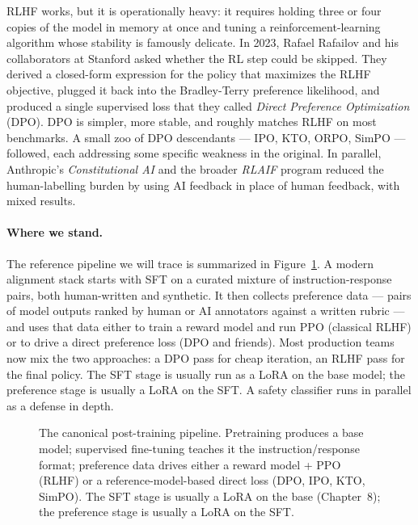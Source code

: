 RLHF works, but it is operationally heavy: it requires holding
three or four copies of the model in memory at once and tuning a
reinforcement-learning algorithm whose stability is famously
delicate. In 2023, Rafael Rafailov and his collaborators at Stanford
asked whether the RL step could be skipped. They derived a
closed-form expression for the policy that maximizes the RLHF
objective, plugged it back into the Bradley-Terry preference
likelihood, and produced a single supervised loss that they called
\emph{Direct Preference Optimization} (DPO). DPO is simpler, more
stable, and roughly matches RLHF on most benchmarks. A small zoo of
DPO descendants --- IPO, KTO, ORPO, SimPO --- followed, each
addressing some specific weakness in the original. In parallel,
Anthropic's \emph{Constitutional AI} and the broader \emph{RLAIF}
program reduced the human-labelling burden by using AI feedback in
place of human feedback, with mixed results.

\paragraph{Where we stand.}
The reference pipeline we will trace is summarized in
Figure~\ref{fig:rlhf-pipeline}. A modern alignment stack starts with
SFT on a curated mixture of instruction-response pairs, both
human-written and synthetic. It then collects preference data ---
pairs of model outputs ranked by human or AI annotators against a
written rubric --- and uses that data either to train a reward
model and run PPO (classical RLHF) or to drive a direct preference
loss (DPO and friends). Most production teams now mix the two
approaches: a DPO pass for cheap iteration, an RLHF pass for the
final policy. The SFT stage is usually run as a LoRA on the base
model; the preference stage is usually a LoRA on the SFT. A safety
classifier runs in parallel as a defense in depth.

\begin{figure}[ht]
  \centering
  
  \caption{The canonical post-training pipeline. Pretraining produces
  a base model; supervised fine-tuning teaches it the instruction/response
  format; preference data drives either a reward model + PPO (RLHF) or a
  reference-model-based direct loss (DPO, IPO, KTO, SimPO). The SFT
  stage is usually a LoRA on the base (Chapter~8); the preference stage
  is usually a LoRA on the SFT.}
  \label{fig:rlhf-pipeline}
\end{figure}

